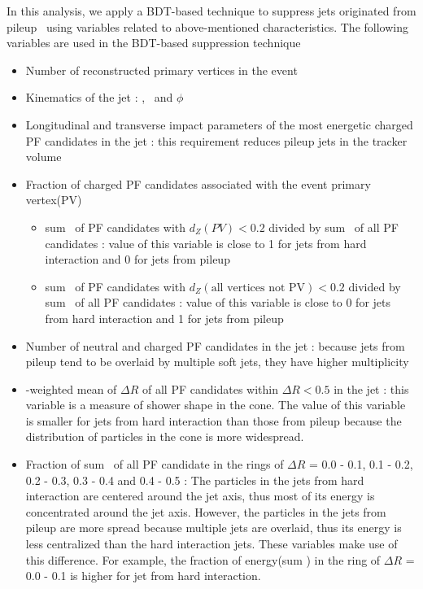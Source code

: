 In this analysis, we apply a BDT-based technique to suppress jets originated 
from pileup~\cite{CMS-PAS-JME-13-005} using variables related to above-mentioned characteristics. 
The following variables are used in the BDT-based suppression technique
\begin{itemize}
\item Number of reconstructed primary vertices in the event 

\item Kinematics of the jet : \pt, \Eta\ and $\phi$ 

\item Longitudinal and transverse impact parameters of the most energetic 
      charged PF candidates in the jet : this requirement reduces pileup 
      jets in the tracker volume

\item Fraction of charged PF candidates associated with the event primary vertex(PV) 
    \begin{itemize}
    \item sum \pt\ of PF candidates with $d_Z(PV) < 0.2$ 
          divided by sum \pt\ of all PF candidates : value of this variable is close to 1 
          for jets from hard interaction and 0 for jets from pileup
           
    \item sum \pt\ of PF candidates with $d_Z(\textrm{all vertices not PV}) < 0.2$
          divided by sum \pt\ of all PF candidates : value of this variable is close to 0 
          for jets from hard interaction and 1 for jets from pileup
    \end{itemize} 

\item Number of neutral and charged PF candidates in the jet : because jets from pileup 
      tend to be overlaid by multiple soft jets, they have higher multiplicity 

\item \pt-weighted mean of $\Delta R$ of all PF candidates within $\Delta R < 0.5$          
      in the jet : this variable is a measure of shower shape in the cone. 
      The value of this variable is smaller for jets from hard interaction 
      than those from pileup because the distribution of particles in the 
      cone is more widespread.

\item Fraction of sum \pt\ of all PF candidate in the rings of 
      $\Delta R$ = 0.0 - 0.1, 0.1 - 0.2, 0.2 - 0.3, 0.3 - 0.4 and 0.4 - 0.5 : 
      The particles in the jets from hard interaction are centered around the 
      jet axis, thus most of its energy is concentrated around the jet axis. 
      However, the particles in the jets from pileup are more spread because 
      multiple jets are overlaid, thus its energy is less centralized than the 
      hard interaction jets. These variables make use of this difference. For example, 
      the fraction of energy(sum \pt) in the ring of $\Delta R$ = 0.0 - 0.1 is higher 
      for jet from hard interaction.   


\end{itemize}
